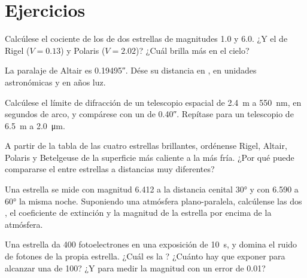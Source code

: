 \section{Ejercicios}

\begin{exercise}[$\star$]\label{exo:b1:observing-the-sky:1}
Calcúlese el cociente de los  de dos estrellas de magnitudes 1.0 y 6.0. ¿Y el de
Rigel ($V = 0.13$) y Polaris ($V = 2.02$)? ¿Cuál brilla más en el cielo?
\end{exercise}

\begin{exercise}[$\star$]\label{exo:b1:observing-the-sky:2}
La paralaje de Altair es \ang{;;0.19495}. Dése su distancia en , en unidades
astronómicas y en años luz.
\end{exercise}

\begin{exercise}[$\star$]\label{exo:b1:observing-the-sky:3}
Calcúlese el límite de difracción de un telescopio espacial de \qty{2.4}{m} a
\qty{550}{nm}, en segundos de arco, y compárese con un  de \ang{;;0.40}. Repítase
para un telescopio de \qty{6.5}{m} a \qty{2.0}{\micro\metre}.
\end{exercise}

\begin{exercise}[$\star$]\label{exo:b1:observing-the-sky:4}
A partir de la tabla de las cuatro estrellas brillantes, ordénense Rigel, Altair, Polaris
y Betelgeuse de la superficie más caliente a la más fría. ¿Por qué puede compararse el
 entre estrellas a distancias muy diferentes?
\end{exercise}

\begin{exercise}[$\star\star$]\label{exo:b1:observing-the-sky:5}
Una estrella se mide con magnitud 6.412 a la distancia cenital \ang{30} y con 6.590 a
\ang{60} la misma noche. Suponiendo una atmósfera plano-paralela, calcúlense las dos , el coeficiente de extinción y la magnitud de la estrella por encima de la atmósfera.
\end{exercise}

\begin{exercise}[$\star\star$]\label{exo:b1:observing-the-sky:6}
Una estrella da 400 fotoelectrones en una exposición de \qty{10}{s}, y domina el ruido de
fotones de la propia estrella. ¿Cuál es la ? ¿Cuánto hay que exponer
para alcanzar una  de 100? ¿Y para medir la magnitud con un error de
\num{0.01}?
\end{exercise}

